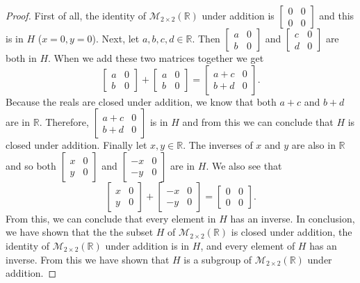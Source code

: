 \documentclass[11pt,a4paper]{article}
\begin{document}
\begin{proof}
First of all, the identity of $\mathcal{M}_{2\times 2}(\mathbb{R})$ under addition is $\begin{bmatrix}
0&0\\
0&0
\end{bmatrix}$ and this is in $H$ ($x=0,y=0$). Next, let $a,b,c,d\in\mathbb{R}$. Then $\begin{bmatrix}
a&0\\
b&0
\end{bmatrix}$
and $\begin{bmatrix}
c&0\\
d&0
\end{bmatrix}$ are both in $H$. When we add these two matrices together we get
\[\begin{bmatrix}
a&0\\
b&0
\end{bmatrix} + 
\begin{bmatrix}
a&0\\
b&0
\end{bmatrix} =
\begin{bmatrix}
a+c&0\\
b+d&0
\end{bmatrix}.
\]
Because the reals are closed under addition, we know that both $a+c$ and $b+d$ are in $\mathbb{R}$. Therefore, $\begin{bmatrix}
a+c&0\\
b+d&0
\end{bmatrix}$ is in $H$ and from this we can conclude that $H$ is closed under addition. Finally let $x,y\in\mathbb{R}$. The inverses of $x$ and $y$ are also in $\mathbb{R}$ and so both
$\begin{bmatrix}x&0\\y&0\end{bmatrix}$ and $\begin{bmatrix}-x&0\\-y&0\end{bmatrix}$ are in $H$. We also see that
\[\begin{bmatrix}x&0\\y&0\end{bmatrix}+\begin{bmatrix}-x&0\\-y&0\end{bmatrix}=\begin{bmatrix}0&0\\0&0\end{bmatrix}.\] From this, we can conclude that every element in $H$ has an inverse. In conclusion, we have shown that the the subset $H$ of $\mathcal{M}_{2\times 2}(\mathbb{R})$ is closed under addition, the identity of $\mathcal{M}_{2\times 2}(\mathbb{R})$ under addition is in $H$, and every element of $H$ has an inverse. From this we have shown that $H$ is a subgroup of $\mathcal{M}_{2\times 2}(\mathbb{R})$ under addition.
\end{proof}
\end{document}
